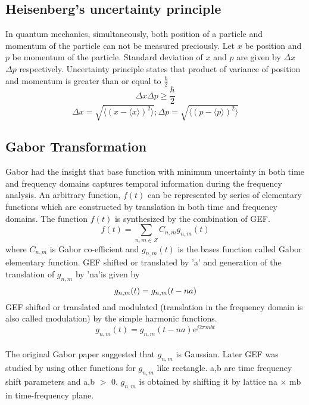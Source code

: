\documentclass[paper=a4, fontsize=11pt,twoside]{scrartcl}		%
\begin{document}
\subsection{Heisenberg's uncertainty principle}
In quantum mechanics, simultaneously, both position of a particle and momentum of the particle can not be measured preciously. Let $x$ be position and $p$ be momentum of the particle. Standard deviation of $x$ and $p$ are given by $\Delta x$ $\Delta p$ respectively. Uncertainty principle states that product of variance of position and momentum is greater than or equal to $\frac{\hbar}{2}$
\begin{equation*}
\Delta x\Delta p \geq \frac{\hbar}{2}
\end{equation*}
\begin{equation*}
\Delta x = \sqrt{\langle(x - \langle x\rangle)^2\rangle};
\Delta p = \sqrt{\langle(p - \langle p \rangle)^2\rangle}
\end{equation*}
\subsection{Gabor Transformation }
Gabor had the insight that base function with minimum uncertainty in both time and frequency domains captures temporal information during the frequency analysis.
An arbitrary function, $f(t)$ can be represented by series of elementary functions which are constructed by translation in both time and frequency domains. The function $f(t)$ is synthesized by the combination of GEF.\\

\begin{equation}
f(t) = \sum_{n,m\in Z} C_{n,m} g_{n,m}(t)
\end{equation}
where $C_{n,m}$ is Gabor co-efficient and $g_{n,m}(t)$ is the bases function called Gabor elementary function. GEF shifted or translated by 'a' and generation of the translation of $g_{n,m}$ by 'na'is given by
\begin{equation*}
g_{n,m}(t) = g_{n,m}(t-na)\\
\end{equation*}
GEF shifted or translated and modulated (translation in the frequency domain is also called modulation) by the simple harmonic functions.
\begin{equation*}
g_{n,m}(t) = g_{n,m}(t-na) e^{j2\pi mbt}
\end{equation*}\\
The original Gabor paper suggested that $g_{n,m}$ is Gaussian. Later GEF was studied by using other functions for $g_{n,m}$ like rectangle.  a,b are time frequency shift parameters and a,b $>$  0. $g_{n,m}$ is obtained by shifting it by lattice na $\times$ mb in time-frequency plane.\\
\end{document}
